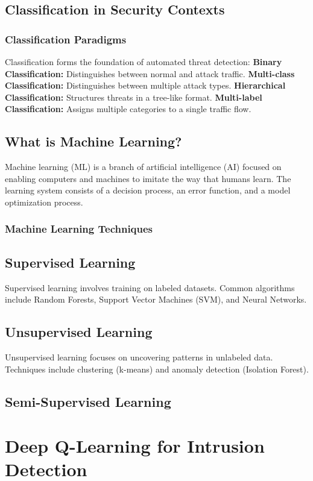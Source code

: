 \documentclass{report}
\begin{document}
\section{Classification in Security Contexts}
\subsection{Classification Paradigms}
Classification forms the foundation of automated threat detection:
\textbf{Binary Classification:} Distinguishes between normal and attack traffic.
\textbf{Multi-class Classification:} Distinguishes between multiple attack types.
\textbf{Hierarchical Classification:} Structures threats in a tree-like format.
\textbf{Multi-label Classification:} Assigns multiple categories to a single traffic flow.

\section*{What is Machine Learning?}
Machine learning (ML) is a branch of artificial intelligence (AI) focused on enabling computers and machines to imitate the way that humans learn. The learning system consists of a decision process, an error function, and a model optimization process.

\subsection{Machine Learning Techniques}
\section*{Supervised Learning}
Supervised learning involves training on labeled datasets. Common algorithms include Random Forests, Support Vector Machines (SVM), and Neural Networks.

\section*{Unsupervised Learning}
Unsupervised learning focuses on uncovering patterns in unlabeled data. Techniques include clustering (k-means) and anomaly detection (Isolation Forest).

\section*{Semi-Supervised Learning}

\chapter{Deep Q-Learning for Intrusion Detection}
\label{chap:dqn-for-ids}
\end{document}
